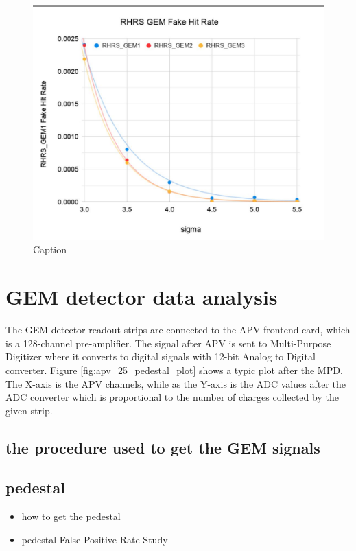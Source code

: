 \begin{figure}
    \centering
    \includegraphics[width=\textwidth]{images/chap5/rhrs_fake_hit_rate.png}
    \caption{Caption}
    \label{fig:my_label}
\end{figure}

\section{GEM detector data analysis}
The GEM detector readout strips are connected to the APV frontend card, which is a 128-channel pre-amplifier. The signal after APV is sent to Multi-Purpose Digitizer where it converts to digital signals with 12-bit Analog to Digital converter.  Figure \ref{fig:apv_25_pedestal_plot} shows a typic plot after the MPD. The X-axis is the APV channels, while as the Y-axis is the ADC values after the ADC converter which is proportional to the number of charges collected by the given strip. 



\subsection{the procedure used to get the GEM signals}
\subsection{pedestal}
\begin{itemize}
    \item how to get the pedestal
    \item pedestal False Positive Rate Study
\end{itemize}
